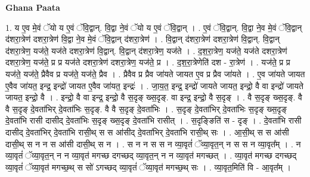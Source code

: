 \documentclass[17pt]{extarticle}
\begin{document}
\textbf{Ghana Paata } \newline

1. य ए॒व मे॒वं ॅयो य ए॒वं ॅवि॒द्वान्. वि॒द्वा ने॒वं ॅयो य ए॒वं ॅवि॒द्वान् । . ए॒वं ॅवि॒द्वान्. वि॒द्वा ने॒व मे॒वं ॅवि॒द्वान् द॑शरा॒त्रेण॑ दशरा॒त्रेण॑ वि॒द्वा ने॒व मे॒वं ॅवि॒द्वान् द॑शरा॒त्रेण॑ । . वि॒द्वान् द॑शरा॒त्रेण॑ दशरा॒त्रेण॑ वि॒द्वान्. वि॒द्वान् द॑शरा॒त्रेण॒ यज॑ते॒ यज॑ते दशरा॒त्रेण॑ वि॒द्वान्. वि॒द्वान् द॑शरा॒त्रेण॒ यज॑ते । . द॒श॒रा॒त्रेण॒ यज॑ते॒ यज॑ते दशरा॒त्रेण॑ दशरा॒त्रेण॒ यज॑ते॒ प्र प्र यज॑ते दशरा॒त्रेण॑ दशरा॒त्रेण॒ यज॑ते॒ प्र । . द॒श॒रा॒त्रेणेति॑ दश - रा॒त्रेण॑ । . यज॑ते॒ प्र प्र यज॑ते॒ यज॑ते॒ प्रैवैव प्र यज॑ते॒ यज॑ते॒ प्रैव । . प्रैवैव प्र प्रैव जा॑यते जायत ए॒व प्र प्रैव जा॑यते । . ए॒व जा॑यते जायत ए॒वैव जा॑यत॒ इन्द्र॒ इन्द्रो॑ जायत ए॒वैव जा॑यत॒ इन्द्रः॑ । . जा॒य॒त॒ इन्द्र॒ इन्द्रो॑ जायते जायत॒ इन्द्रो॒ वै वा इन्द्रो॑ जायते जायत॒ इन्द्रो॒ वै । . इन्द्रो॒ वै वा इन्द्र॒ इन्द्रो॒ वै स॒दृङ् ख्स॒दृङ्. वा इन्द्र॒ इन्द्रो॒ वै स॒दृङ् । . वै स॒दृङ् ख्स॒दृङ्. वै वै स॒दृङ् दे॒वता॑भिर् दे॒वता॑भिः स॒दृङ्. वै वै स॒दृङ् दे॒वता॑भिः । . स॒दृङ् दे॒वता॑भिर् दे॒वता॑भिः स॒दृङ् ख्स॒दृङ् दे॒वता॑भि रासी दासीद् दे॒वता॑भिः स॒दृङ् ख्स॒दृङ् दे॒वता॑भि रासीत् । . स॒दृङ्ङिति॑ स - दृङ् । . दे॒वता॑भि रासी दासीद् दे॒वता॑भिर् दे॒वता॑भि रासी॒थ् स स आ॑सीद् दे॒वता॑भिर् दे॒वता॑भि रासी॒थ् सः । . आ॒सी॒थ् स स आ॑सी दासी॒थ् स न न स आ॑सी दासी॒थ् स न । . स न न स स न व्या॒वृतं॑ ॅव्या॒वृत॒न् न स स न व्या॒वृत᳚म् । . न व्या॒वृतं॑ ॅव्या॒वृत॒न् न न व्या॒वृत॑ मगच्छ दगच्छद् व्या॒वृत॒न् न न व्या॒वृत॑ मगच्छत् । . व्या॒वृत॑ मगच्छ दगच्छद् व्या॒वृतं॑ ॅव्या॒वृत॑ मगच्छ॒थ् स सो॑ ऽगच्छद् व्या॒वृतं॑ ॅव्या॒वृत॑ मगच्छ॒थ् सः । . व्या॒वृत॒मिति॑ वि - आ॒वृत᳚म् । \newline
\end{document}
